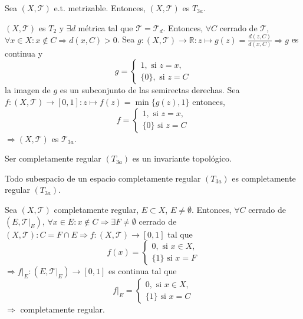 \begin{prop}
  Sea $( X, \mathcal{T} )$ e.t. metrizable. Entonces, $( X, \mathcal{T} )$ es $T_{3a}$.
\end{prop}

\begin{dem}
  $( X, \mathcal{T} )$ es $T_{2}$ y $\exists d$ métrica tal que $\mathcal{T} = \mathcal{T}_{d}$. Entonces, $\forall C $ cerrado de $\mathcal{T}$, $\forall x \in X: x \not \in C \Rightarrow d(x, C) > 0$. Sea $g: ( X, \mathcal{T} ) \to \mathbb{R}: z \mapsto g(z) = \frac{d(z, C)}{d(x, C)} \Rightarrow g$ es continua y
  \[ 
    g =
    \begin{cases}
      1, \text{ si } z=x,\\
    \{ 0 \},  \text{ si } z = C
    \end{cases} 
  \] 
  la imagen de $g$ es un subconjunto de las semirectas derechas. Sea $f: ( X, \mathcal{T} ) \to [0, 1] : z \mapsto f(z) = \min \{  g(z), 1 \}$ entonces,
  \[ 
    f =
    \begin{cases}
      1, \text{ si } z=x,\\
      \{ 0 \} \text{ si } z = C
    \end{cases} 
  \] 
  $\Rightarrow ( X, \mathcal{T} )$ es $\mathcal{T}_{3a}$.
\end{dem}

\begin{obs}
  Ser completamente regular $(T_{3a})$ es un invariante topológico.
\end{obs}

\begin{prop}
  Todo subespacio de un espacio completamente regular $(T_{3a})$ es completamente regular $(T_{3a})$.
\end{prop}

\begin{dem}
  Sea $( X, \mathcal{T} )$ completamente regular, $E \subset X$, $E \neq \emptyset$. Entonces, $\forall C$ cerrado de $ ( E, \mathcal{T}|_{E})$, $\forall x \in E: x \not \in C \Rightarrow \exists F \neq \emptyset$ cerrado de $( X, \mathcal{T} ): C = F \cap E \Rightarrow f: ( X, \mathcal{T} ) \to [0, 1]$ tal que
  \[ 
    f(x) =
    \begin{cases}
      0, \text{ si } x \in X,\\
      \{ 1 \} \text{ si } x = F
    \end{cases} 
  \] 
  $\Rightarrow f|_{E}: ( E, \mathcal{T}|_{E}) \to [0, 1]$ es continua tal que
  \[ 
    f|_{E} =
    \begin{cases}
      0, \text{ si } x \in X,\\
      \{ 1 \} \text{ si } x = C
    \end{cases} 
  \] 
  $\Rightarrow $ completamente regular.
\end{dem}

